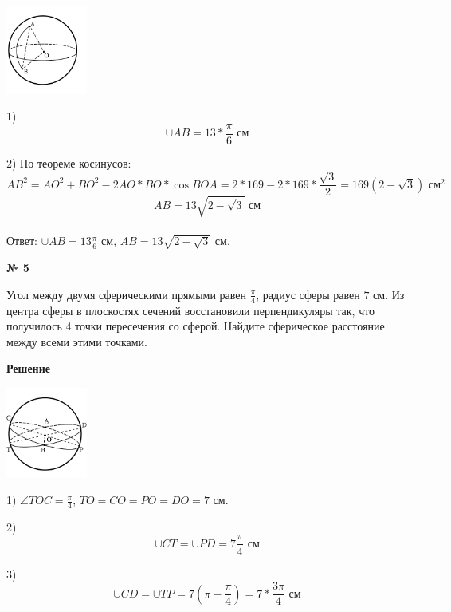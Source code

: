     \begin{center}
        \includegraphics[width=0.2\textwidth]{images/img7}\\
    \end{center}

    1)
    \[
        \cup AB = 13 * \frac{\pi}{6} \text{ см}
    \]

    2) По теореме косинусов:
    \[
        AB ^ 2 = AO ^ 2 + BO ^ 2 - 2AO*BO*\cos BOA = 2 * 169 - 2 * 169 * \frac{\sqrt {3}}{2} = 169(2 - \sqrt {3}) \text{ см}^2
    \]
    \[
        AB = 13\sqrt {2 - \sqrt {3}} \text{ см}
    \]\\

    Ответ: $\cup AB = 13\frac{\pi}{6}$ см, $AB = 13\sqrt {2 - \sqrt {3}}$ см.
    \begin{center}
        \textbf{№ 5}
    \end{center}

    Угол между двумя сферическими прямыми равен $\frac{\pi}{4}$, радиус сферы равен $7$ см.
    Из центра сферы в плоскостях сечений восстановили перпендикуляры так, что получилось 4 точки пересечения со сферой.
    Найдите сферическое расстояние между всеми этими точками.

    \textbf{Решение}\\

    \begin{center}
        \includegraphics[width=0.2\textwidth]{images/img8}\\
    \end{center}

    1) $\angle TOC = \frac{\pi}{4}$, $TO = CO = PO = DO = 7$ см.

    2)
    \[
        \cup CT = \cup PD = 7\frac{\pi}{4} \text{ см}
    \]

    3) \[
           \cup CD = \cup TP = 7\left(\pi - \frac{\pi}{4}\right) = 7*\frac{3\pi}{4}\text{ см}
    \]

